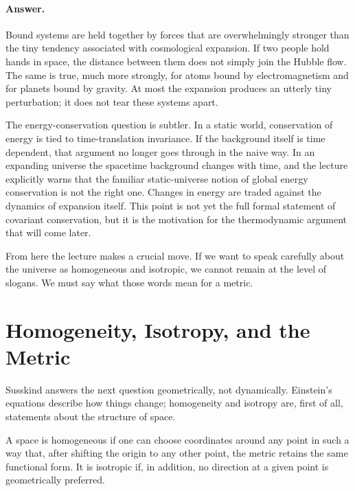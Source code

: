 \paragraph{Answer.} Bound systems are held together by forces that are overwhelmingly stronger than the tiny tendency associated with cosmological expansion. If two people hold hands in space, the distance between them does not simply join the Hubble flow. The same is true, much more strongly, for atoms bound by electromagnetism and for planets bound by gravity. At most the expansion produces an utterly tiny perturbation; it does not tear these systems apart.

The energy-conservation question is subtler. In a static world, conservation of energy is tied to time-translation invariance. If the background itself is time dependent, that argument no longer goes through in the naive way. In an expanding universe the spacetime background changes with time, and the lecture explicitly warns that the familiar static-universe notion of global energy conservation is not the right one. Changes in energy are traded against the dynamics of expansion itself. This point is not yet the full formal statement of covariant conservation, but it is the motivation for the thermodynamic argument that will come later.

From here the lecture makes a crucial move. If we want to speak carefully about the universe as homogeneous and isotropic, we cannot remain at the level of slogans. We must say what those words mean for a metric.

\section{Homogeneity, Isotropy, and the Metric}

Susskind answers the next question geometrically, not dynamically. Einstein's equations describe how things change; homogeneity and isotropy are, first of all, statements about the structure of space.

\begin{definition}
A space is homogeneous if one can choose coordinates around any point in such a way that, after shifting the origin to any other point, the metric retains the same functional form. It is isotropic if, in addition, no direction at a given point is geometrically preferred.
\end{definition}

